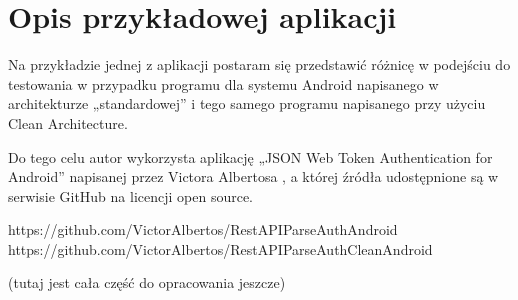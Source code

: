\chapter{Opis przykładowej aplikacji}
\label{analiza_testow}

Na przykładzie jednej z aplikacji postaram się przedstawić różnicę w podejściu do testowania w przypadku programu dla systemu Android napisanego w architekturze „standardowej” i tego samego programu napisanego przy użyciu Clean Architecture.

Do tego celu autor wykorzysta aplikację „JSON Web Token Authentication for Android” napisanej przez Victora Albertosa , a której źródła udostępnione są w serwisie GitHub na licencji open source.

https://github.com/VictorAlbertos/RestAPIParseAuthAndroid
https://github.com/VictorAlbertos/RestAPIParseAuthCleanAndroid

(tutaj jest cała część do opracowania jeszcze)
